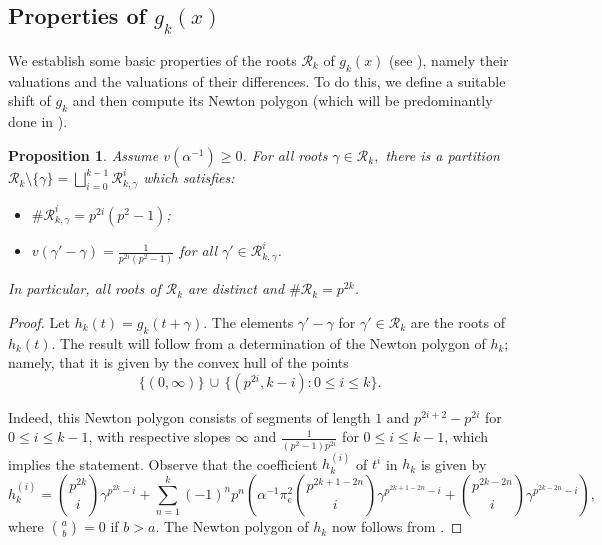 \documentclass{amsart}
\newtheorem{proposition}[theorem]{Proposition}
\theoremstyle{definition}
\numberwithin{theorem}{section}
\numberwithin{equation}{section}
\begin{document}
\subsection{Properties of $g_k(x)$}
We establish some basic properties of the roots $\mathcal{R}_k$ of $g_k(x)$ (see ), namely their valuations and the valuations of their differences. To do this, we define a suitable shift of $g_k$ and then compute its Newton polygon (which will be predominantly done in ).


\begin{proposition}\label{prop: shifted Newton polygon}
Assume $v(\alpha^{-1}) \geq 0$. For all roots $\gamma \in \mathcal{R}_k,$ there is a partition $\mathcal{R}_k\setminus \{\gamma\} = \bigsqcup_{i=0}^{k-1} \mathcal{R}_{k,\gamma}^i$ which satisfies:
\begin{itemize}
    \item $\# \mathcal{R}_{k,\gamma}^i = p^{2i}(p^2-1)$;
    \item $v(\gamma'-\gamma)=\frac{1}{p^{2i}(p^2-1)}$ for all $\gamma' \in \mathcal{R}_{k,\gamma}^i$.
\end{itemize}
In particular, all roots of $\mathcal{R}_k$ are distinct and $\#\mathcal{R}_k=p^{2k}$.
\end{proposition}

\begin{proof}
Let $h_k(t)=g_k(t+\gamma)$. The elements $\gamma'-\gamma$ for $\gamma' \in \mathcal{R}_k$ are the roots of $h_k(t)$. The result will follow from a determination of the Newton polygon of $h_k$; namely, that it is given by the convex hull of the points
\[
\{(0,\infty) \} \, \cup \, \{(p^{2i},k-i) : 0 \leq i \leq k\}.
\]

Indeed, this Newton polygon consists of segments of length $1$ and $p^{2i+2}-p^{2i}$ for $0 \leq i \leq k-1$, with respective slopes $\infty$ and $\frac{1}{(p^2-1)p^{2i}}$ for $0 \leq i \leq k-1$, which implies the statement. Observe that the coefficient $h_k^{(i)}$ of $t^i$ in $h_k$ is given by
\begin{equation}\label{eq: coefficients shifted polynomial}
h_k^{(i)} = \binom{p^{2k}}{i}\gamma^{p^{2k}-i} + \sum_{n=1}^k (-1)^np^n \left( \alpha^{-1}\pi_e^2 \binom{p^{2k+1-2n}}{i}\gamma^{p^{2k+1-2n}-i} + \binom{p^{2k-2n}}{i}\gamma^{p^{2k-2n}-i} \right),
\end{equation}
where $\binom{a}{b}=0$ if $b>a$. The Newton polygon of $h_k$ now follows from .
\end{proof}
\end{document}
